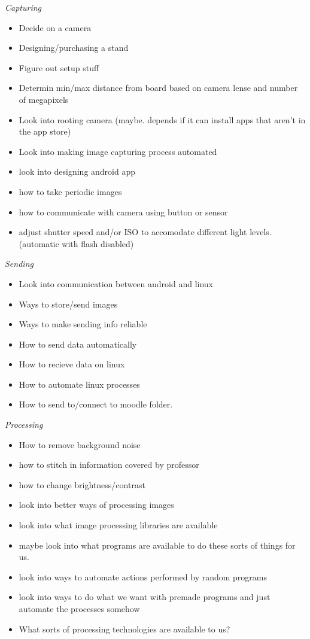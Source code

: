 \documentclass[]{article}
\begin{document}
			\emph{Capturing} 
			\begin{itemize}
				\item Decide on a camera
				\item Designing/purchasing a stand
				\item Figure out setup stuff
				\item Determin min/max distance from board based on camera lense and number of megapixels
				\item Look into rooting camera (maybe. depends if it can install apps that aren't in the app store)
				\item Look into making image capturing process automated
				\item look into designing android app
				\item how to take periodic images
				\item how to communicate with camera using button or sensor
				\item adjust shutter speed and/or ISO to accomodate different light levels. (automatic with flash disabled)
			\end{itemize} 
			
			\emph{Sending}
			\begin{itemize}
				\item Look into communication between android and linux
				\item Ways to store/send images
				\item Ways to make sending info reliable
				\item How to send data automatically
				\item How to recieve data on linux
				\item How to automate linux processes
				\item How to send to/connect to moodle folder.
			\end{itemize}
			
			\emph{Processing}
			\begin{itemize}
				\item How to remove background noise
				\item how to stitch in information covered by professor
				\item how to change brightness/contrast
				\item look into better ways of processing images
				\item look into what image processing libraries are available
				\item maybe look into what programs are available to do these sorts of things for us.
				\item look into ways to automate actions performed by random programs
				\item look into ways to do what we want with premade programs and just automate the processes somehow
				\item What sorts of processing technologies are available to us?
			\end{itemize}
			
\end{document}
